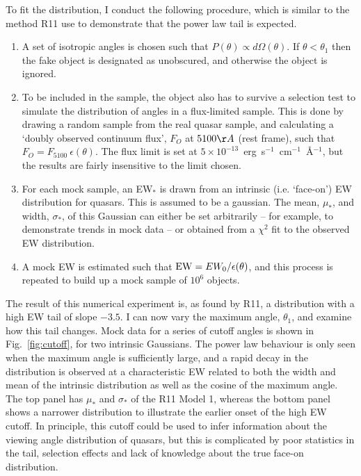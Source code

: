 To fit the distribution, I conduct the following procedure,
which is similar to the method R11 use to demonstrate that the power
law tail is expected.
\begin{enumerate}
	\setlength\itemsep{1em}
	\item A set of isotropic angles is chosen such that 
	$P(\theta)\propto d\Omega(\theta)$. 
	If $\theta<\theta_{1}$ then the fake object is designated as unobscured, 
	and otherwise the object is ignored. 
	\item To be included in the sample, the object also has to 
	survive a selection test
	to simulate the distribution of angles in a flux-limited sample.
	This is done by drawing a random sample from the real quasar sample, 
	and calculating a `doubly observed continuum flux', $F_O$ at $5100\AA$ 
	(rest frame), such that $F_O = F_{5100}~\epsilon(\theta)$. The flux limit
	is set at $5\times10^{-13}$~erg~s$^{-1}$~cm$^{-1}$~\AA$^{-1}$, but the results
	are fairly insensitive to the limit chosen.
	\item For each mock sample, an EW$_*$ is drawn from an intrinsic 
	(i.e. `face-on') EW distribution for quasars. This is assumed to be a
	gaussian. The mean, $\mu_*$, and width, $\sigma_*$, of this Gaussian
	can either be set arbitrarily -- for example, to demonstrate trends
	in mock data -- or obtained from a $\chi^2$ fit to the observed EW
	distribution.
	\item A mock EW is estimated such that ${\rm EW} = EW_0 / \epsilon(\theta)$,
	and this process is repeated to build up a mock sample of $10^6$ objects.
\end{enumerate}
The result of this numerical experiment is, as found by R11, a distribution
with a high EW tail of slope $-3.5$. I can now vary the maximum angle, $\theta_1$,
and examine how this tail changes. Mock data for a series
of cutoff angles is shown in Fig.~\ref{fig:cutoff}, for two intrinsic 
Gaussians. The power law behaviour is only seen when the maximum angle is
sufficiently large, and a rapid decay in the distribution is observed
at a characteristic EW related to both the width and mean of the
intrinsic distribution as well as the cosine of the maximum angle.
The top panel has $\mu_*$ and $\sigma_*$ of the R11 Model 1, 
whereas the bottom panel shows a narrower distribution to illustrate the 
earlier onset of the high EW cutoff. In principle, this cutoff could
be used to infer information about the viewing angle distribution
of quasars, but this is complicated by poor statistics in the tail,
selection effects and lack of knowledge about the true face-on
distribution.


